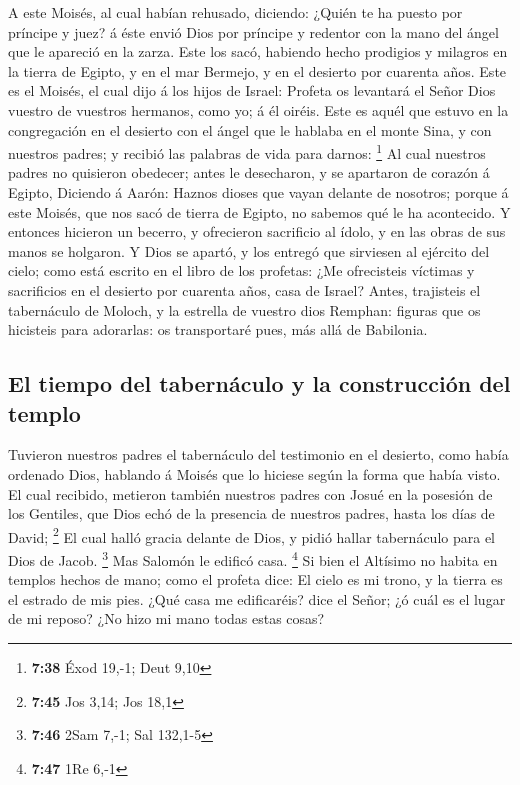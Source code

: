  A este Moisés, al cual habían rehusado, diciendo: ¿Quién
te ha puesto por príncipe y juez? á éste envió Dios por príncipe y
redentor con la mano del ángel que le apareció en la zarza.
 Este los sacó, habiendo hecho prodigios y milagros en la
tierra de Egipto, y en el mar Bermejo, y en el desierto por cuarenta
años.  Este es el Moisés, el cual dijo á los hijos de
Israel: Profeta os levantará el Señor Dios vuestro de vuestros hermanos,
como yo; á él oiréis.  Este es aquél que estuvo en la
congregación en el desierto con el ángel que le hablaba en el monte
Sina, y con nuestros padres; y recibió las palabras de vida para darnos:
\footnote{\textbf{7:38} Éxod 19,-1; Deut 9,10}  Al cual
nuestros padres no quisieron obedecer; antes le desecharon, y se
apartaron de corazón á Egipto,  Diciendo á Aarón: Haznos
dioses que vayan delante de nosotros; porque á este Moisés, que nos sacó
de tierra de Egipto, no sabemos qué le ha acontecido.  Y
entonces hicieron un becerro, y ofrecieron sacrificio al ídolo, y en las
obras de sus manos se holgaron.  Y Dios se apartó, y los
entregó que sirviesen al ejército del cielo; como está escrito en el
libro de los profetas: ¿Me ofrecisteis víctimas y sacrificios en el
desierto por cuarenta años, casa de Israel?  Antes,
trajisteis el tabernáculo de Moloch, y la estrella de vuestro dios
Remphan: figuras que os hicisteis para adorarlas: os transportaré pues,
más allá de Babilonia.

\hypertarget{el-tiempo-del-tabernuxe1culo-y-la-construcciuxf3n-del-templo}{%
\subsection{El tiempo del tabernáculo y la construcción del
templo}\label{el-tiempo-del-tabernuxe1culo-y-la-construcciuxf3n-del-templo}}

 Tuvieron nuestros padres el tabernáculo del testimonio en
el desierto, como había ordenado Dios, hablando á Moisés que lo hiciese
según la forma que había visto.  El cual recibido, metieron
también nuestros padres con Josué en la posesión de los Gentiles, que
Dios echó de la presencia de nuestros padres, hasta los días de David;
\footnote{\textbf{7:45} Jos 3,14; Jos 18,1}  El cual halló
gracia delante de Dios, y pidió hallar tabernáculo para el Dios de
Jacob. \footnote{\textbf{7:46} 2Sam 7,-1; Sal 132,1-5}  Mas
Salomón le edificó casa. \footnote{\textbf{7:47} 1Re 6,-1} 
Si bien el Altísimo no habita en templos hechos de mano; como el profeta
dice:  El cielo es mi trono, y la tierra es el estrado de
mis pies. ¿Qué casa me edificaréis? dice el Señor; ¿ó cuál es el lugar
de mi reposo?  ¿No hizo mi mano todas estas cosas?

